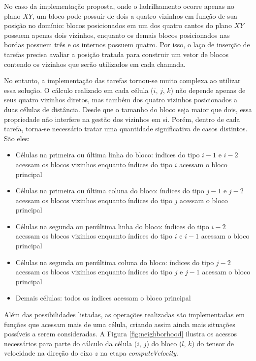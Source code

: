 \documentclass[cic,tc]{iiufrgs}
\begin{document}
No caso da implementação proposta, onde o ladrilhamento ocorre apenas no plano $XY$, um bloco pode possuir de dois a quatro vizinhos
em função de sua posição no domínio: blocos posicionados em um dos quatro cantos do plano $XY$ possuem apenas dois vizinhos, enquanto
os demais blocos posicionados nas bordas possuem três e os internos possuem quatro. Por isso, o laço de inserção de tarefas precisa
avaliar a posição tratada para construir um vetor de blocos contendo os vizinhos que serão utilizados em cada chamada.

No entanto, a implementação das tarefas tornou-se muito complexa ao utilizar essa solução. O cálculo realizado em cada célula ($i$, $j$, $k$)
não depende apenas de seus quatro vizinhos diretos, mas também dos quatro vizinhos posicionados a duas células de distância. Desde que o tamanho
do bloco seja maior que dois, essa propriedade não interfere na gestão dos vizinhos em si. Porém, dentro de cada tarefa, torna-se
necessário tratar uma quantidade significativa de casos distintos. São eles:

\begin{itemize}
\item{Células na primeira ou última linha do bloco:} índices do tipo $i - 1$ e $i - 2$ acessam os blocos vizinhos enquanto índices do tipo $i$ acessam o bloco principal 
\item{Células na primeira ou última coluna do bloco:} índices do tipo $j - 1$ e $j - 2$ acessam os blocos vizinhos enquanto índices do tipo $j$ acessam o bloco principal
\item{Células na segunda ou penúltima linha do bloco:} índices do tipo $i - 2$ acessam os blocos vizinhos enquanto índices do tipo $i$ e $i - 1$ acessam o bloco principal
\item{Células na segunda ou penúltima coluna do bloco:} índices do tipo $j - 2$ acessam os blocos vizinhos enquanto índices do tipo $j$ e $j - 1$ acessam o bloco principal
\item{Demais células:} todos os índices acessam o bloco principal
\end{itemize}

Além das possibilidades listadas, as operações realizadas são implementadas em funções que acessam mais de uma célula, criando assim
ainda mais situações possíveis a serem consideradas. A Figura \ref{fig:neighborhood} ilustra os acessos necessários para parte do cálculo
da célula ($i$, $j$) do bloco ($l$, $k$) do tensor de velocidade na direção do eixo $z$ na etapa \textit{computeVelocity}.
\end{document}
